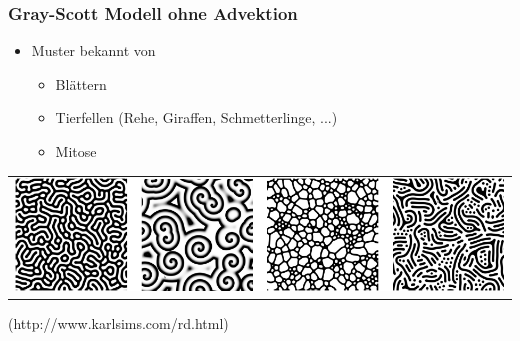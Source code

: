 \documentclass[12pt]{beamer}
\begin{document}
      \begin{frame}
      \frametitle{Gray-Scott Modell ohne Advektion}

      \begin{itemize}
	  \item Muster bekannt von
      \begin{itemize}
	  \item	Blättern
	  \item Tierfellen (Rehe, Giraffen, Schmetterlinge, ...)
	  \item Mitose
      \end{itemize}
      \end{itemize}
      \begin{tabular}{l}
	  \includegraphics[width=\textwidth,keepaspectratio]{Bilder/gs_scenarios.png} \\
      \end{tabular}
      
      {\tiny (http://www.karlsims.com/rd.html)}

    \end{frame}
\end{document}
